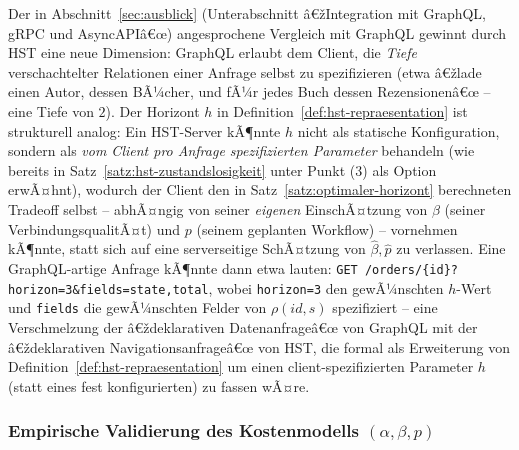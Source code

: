 ﻿\documentclass[a4paper,12pt]{article}
\theoremstyle{definition}
\begin{document}
Der in Abschnitt~\ref{sec:ausblick} (Unterabschnitt â€žIntegration mit GraphQL, gRPC und
AsyncAPIâ€œ) angesprochene Vergleich mit GraphQL gewinnt durch HST eine neue Dimension:
GraphQL erlaubt dem Client, die \emph{Tiefe} verschachtelter Relationen einer Anfrage
selbst zu spezifizieren (etwa â€žlade einen Autor, dessen BÃ¼cher, und fÃ¼r jedes Buch dessen
Rezensionenâ€œ -- eine Tiefe von $2$). Der Horizont $h$ in
Definition~\ref{def:hst-repraesentation} ist strukturell analog: Ein HST-Server kÃ¶nnte
$h$ nicht als statische Konfiguration, sondern als \emph{vom Client pro Anfrage
spezifizierten Parameter} behandeln (wie bereits in Satz~\ref{satz:hst-zustandslosigkeit}
unter Punkt (3) als Option erwÃ¤hnt), wodurch der Client den in
Satz~\ref{satz:optimaler-horizont} berechneten Tradeoff selbst -- abhÃ¤ngig von seiner
\emph{eigenen} EinschÃ¤tzung von $\beta$ (seiner VerbindungsqualitÃ¤t) und $p$ (seinem
geplanten Workflow) -- vornehmen kÃ¶nnte, statt sich auf eine serverseitige SchÃ¤tzung von
$\hat\beta,\hat p$ zu verlassen. Eine GraphQL-artige Anfrage kÃ¶nnte dann etwa lauten:
\texttt{GET /orders/\{id\}?horizon=3\&fields=state,total}, wobei \texttt{horizon=3} den
gewÃ¼nschten $h$-Wert und \texttt{fields} die gewÃ¼nschten Felder von $\rho(id,s)$
spezifiziert -- eine Verschmelzung der â€ždeklarativen Datenanfrageâ€œ von GraphQL mit der
â€ždeklarativen Navigationsanfrageâ€œ von HST, die formal als Erweiterung von
Definition~\ref{def:hst-repraesentation} um einen client-spezifizierten Parameter $h$
(statt eines fest konfigurierten) zu fassen wÃ¤re.

\subsubsection{Empirische Validierung des Kostenmodells $(\alpha,\beta,p)$}
\end{document}
